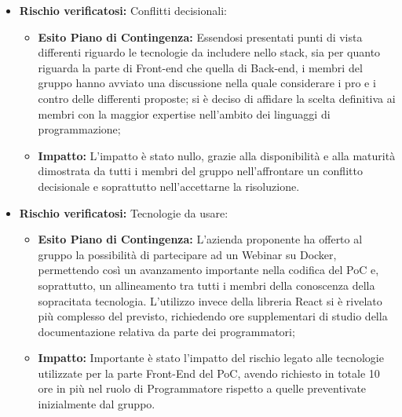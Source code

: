 \begin{itemize}
\item \textbf{Rischio verificatosi:} Conflitti decisionali:
\begin{itemize}
\item \textbf{Esito Piano di Contingenza:} Essendosi presentati punti di vista differenti riguardo le tecnologie da includere nello stack, sia per quanto riguarda la parte di Front-end che quella di Back-end, i membri del gruppo hanno avviato una discussione nella quale considerare i pro e i contro delle differenti proposte; si è deciso di affidare la scelta definitiva ai membri con la maggior expertise nell'ambito dei linguaggi di programmazione;
\item \textbf{Impatto:} L'impatto è stato nullo, grazie alla disponibilità e alla maturità dimostrata da tutti i membri del gruppo nell'affrontare un conflitto decisionale e soprattutto nell'accettarne la risoluzione.
\end{itemize}

\item \textbf{Rischio verificatosi:} Tecnologie da usare:
\begin{itemize}
\item \textbf{Esito Piano di Contingenza:} L'azienda proponente ha offerto al gruppo la possibilità di partecipare ad un Webinar su Docker, permettendo così un avanzamento importante nella codifica del PoC e, soprattutto, un allineamento tra tutti i membri della conoscenza della sopracitata tecnologia. L'utilizzo invece della libreria React si è rivelato più complesso del previsto, richiedendo ore supplementari di studio della documentazione relativa da parte dei programmatori;
\item \textbf{Impatto:} Importante è stato l'impatto del rischio legato alle tecnologie utilizzate per la parte Front-End del PoC, avendo richiesto in totale 10 ore in più nel ruolo di Programmatore rispetto a quelle preventivate inizialmente dal gruppo.
\end{itemize}


\end{itemize}
